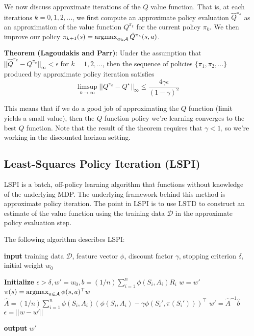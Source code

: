 \documentclass[11pt]{article}
\begin{document}
We now discuss approximate iterations of the $Q$ value function. That is, at each iterations $k=0, 1, 2, \ldots$, we first compute an approximate policy evaluation $\hat{Q}^{\pi_k}$ as an approximation of the value function $Q^{\pi_k}$ for the current policy $\pi_k$. We then improve our policy $\pi_{k+1}(s) = \operatorname*{argmax}_{a \in \mathcal{A}} \hat{Q}^{\pi_k}(s,a)$.

\textbf{Theorem (Lagoudakis and Parr)}: Under the assumption that $||\hat{Q}^{\pi_k} - Q^{\pi_k}||_\infty < \epsilon$ for $k = 1, 2, \ldots$, then the sequence of policies $\{\pi_1, \pi_2, \ldots\}$ produced by approximate policy iteration satisfies
$$\limsup_{k \to \infty} ||Q^{\pi_k} - Q^\star||_\infty \leq \frac{4\gamma\epsilon}{(1 - \gamma)^2}$$

This means that if we do a good job of approximating the $Q$ function (limit yields a small value), then the $Q$ function policy we're learning converges to the best $Q$ function. Note that the result of the theorem requires that $\gamma < 1$, so we're working in the discounted horizon setting.

\subsection{Least-Squares Policy Iteration (LSPI)}

LSPI is a batch, off-policy learning algorithm that functions without knowledge of the underlying MDP. The underlying framework behind this method is approximate policy iteration. The point in LSPI is to use LSTD to construct an estimate of the value function using the training data $\mathcal{D}$ in the approximate policy evaluation step.

The following algorithm describes LSPI:

\begin{algorithm}
  \caption*{\textbf{input} training data $\mathcal{D}$, feature vector $\phi$, discount factor $\gamma$, stopping criterion $\delta$, initial weight $w_0$}
  \begin{algorithmic}
    \STATE \textbf{Initialize} $\epsilon > \delta, w' = w_0, \hat{b} = (1/n)\sum_{i=1}^n \phi(S_i, A_i)R_i$
    \WHILE{$\epsilon > \delta$}
    \STATE $w=w'$
    \STATE $\pi(s) = \operatorname*{argmax}_{a \in \mathcal{A}} \phi(s,a)^\top w$
    \STATE $\hat{A} = (1/n) \sum_{i=1}^n \phi(S_i,A_i) (\phi(S_i, A_i) - \gamma \phi(S_i', \pi(S_i')))^\top$
    \STATE $w' = \hat{A}^{-1}\hat{b}$
    \STATE $\epsilon = ||w - w'||$
    \ENDWHILE    
  \end{algorithmic}
  \textbf{output} $w'$
\end{algorithm}
\end{document}
